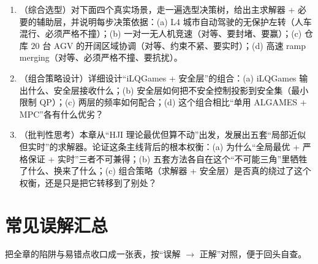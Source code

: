 \begin{practice}
\begin{enumerate}
  \item （综合选型）对下面四个真实场景，走一遍选型决策树，给出主求解器 + 必要的辅助层，并说明每步决策依据：(a) L4 城市自动驾驶的无保护左转（人车混行、必须严格不撞）；(b) 一对一无人机竞速（对等、要封堵、要赢）；(c) 仓库 $20$ 台 AGV 的开阔区域协调（对等、约束不紧、要实时）；(d) 高速 ramp merging（对等、必须严格不撞、要抗扰）。
  \item （组合策略设计）详细设计“iLQGames + 安全层”的组合：(a) iLQGames 输出什么、安全层接收什么；(b) 安全层如何把不安全控制投影到安全集（最小限制 QP）；(c) 两层的频率如何配合；(d) 这个组合相比“单用 ALGAMES + MPC”各有什么优劣？
  \item （批判性思考）本章从“HJI 理论最优但算不动”出发，发展出五套“局部近似但实时”的求解器。论证这条主线背后的根本权衡：(a) 为什么“全局最优 + 严格保证 + 实时”三者不可兼得；(b) 五套方法各自在这个“不可能三角”里牺牲了什么、换来了什么；(c) 组合策略（求解器 + 安全层）是否真的绕过了这个权衡，还是只是把它转移到了别处？
\end{enumerate}
\end{practice}

\section*{常见误解汇总}

把全章的陷阱与易错点收口成一张表，按“误解 $\to$ 正解”对照，便于回头自查。

